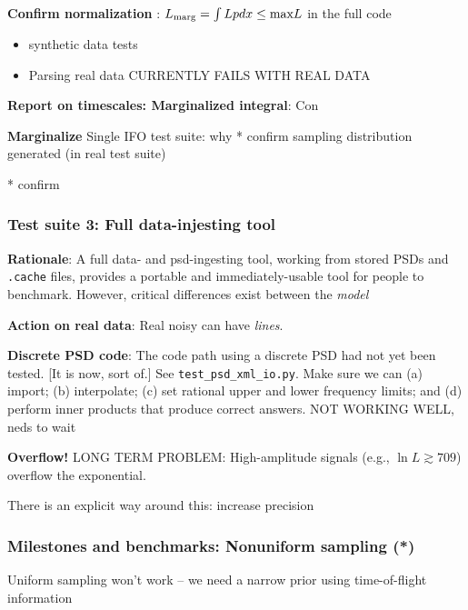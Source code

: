 \documentclass[twocolumn,prd,nofootinbib]{revtex4}
\newcommand\editremark[1]{{\color{red} #1}}
\begin{document}
\begin{widetext}
\begin{widetext}
\textbf{Confirm normalization }:  $L_{\rm marg} = \int L p dx \le \text{max} L$ in the full code
\begin{itemize}
\item synthetic data tests
\item Parsing real data  \editremark{CURRENTLY FAILS WITH
REAL DATA}

\end{itemize}

\noindent \textbf{Report on timescales: Marginalized integral}: Con


\noindent \textbf{Marginalize}
Single IFO test suite: why
* confirm sampling distribution generated (in real test suite)

* confirm 


\subsubsection{Test suite 3: Full data-injesting tool}
\noindent \textbf{Rationale}: A full data- and psd-ingesting tool, working from stored PSDs and \texttt{.cache} files,
provides a portable and immediately-usable tool for people to benchmark.  However, critical differences exist between
the \emph{model}


\noindent \textbf{Action on real data}: Real noisy can have \emph{lines}.

\noindent \textbf{Discrete PSD code}: The  code path using a discrete PSD had not yet been tested. [It is now, sort of.]
See \texttt{test\_psd\_xml\_io.py}.  Make sure we can (a) import; (b) interpolate; (c) set rational upper and lower
frequency limits; and (d) perform inner products that produce correct answers.
\editremark{NOT WORKING WELL, neds to wait}


\noindent \textbf{Overflow!} \editremark{LONG TERM PROBLEM}: High-amplitude signals (e.g., $\ln L \gtrsim 709$) overflow
the exponential.

There is an explicit way around this: increase precision






\subsubsection{Milestones and benchmarks: Nonuniform sampling (*)} 
Uniform sampling won't work -- we need a narrow prior using time-of-flight information


\end{widetext}
\end{widetext}
\end{document}
